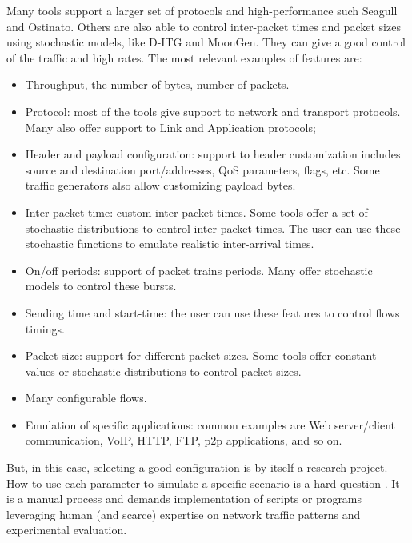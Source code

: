 Many tools support a larger set of protocols and high-performance such Seagull and Ostinato. Others are also able to control inter-packet times and packet sizes using stochastic models, like D-ITG\cite{ditg-paper} and MoonGen. They can give a good control of the traffic and high rates. The most relevant examples of features are:

\begin{itemize}

\item Throughput, the number of bytes, number of packets.

\item Protocol: most of the tools give support to network and transport protocols. Many also offer support to Link and Application protocols;

\item Header and payload configuration: support to header customization includes source and destination port/addresses, QoS parameters, flags, etc. Some traffic generators also allow customizing payload bytes.

\item Inter-packet time: custom inter-packet times. Some tools offer a set of stochastic distributions to control inter-packet times. The user can use these stochastic functions to emulate realistic inter-arrival times.

\item On/off periods: support of packet trains periods. Many offer stochastic models to control these bursts. 

\item Sending time and start-time: the user can use these features to control flows timings.  

\item Packet-size: support for different packet sizes. Some tools offer constant values or stochastic distributions to control packet sizes.

\item Many configurable flows.

\item Emulation of specific applications: common examples are Web server/client communication, VoIP, HTTP, FTP, p2p applications, and so on.

\end{itemize}

But, in this case, selecting a good configuration is by itself a research project. How to use each parameter to simulate a specific scenario is a hard question \cite{legotg-paper}\cite{selfsimilar-ethernet}. It is a manual process and demands implementation of scripts or programs leveraging human (and scarce) expertise on network traffic patterns and experimental evaluation.

